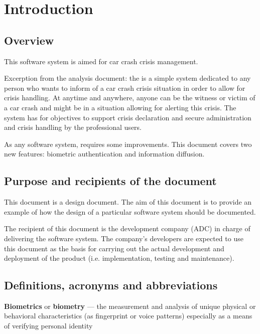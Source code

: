 \chapter{Introduction}
\label{chap:introduction}


\section{Overview}
This software system is aimed for car crash crisis management.

Excerption from the analysis document: the \msricrash is a simple system
dedicated to any person who wants to inform of a car crash crisis situation in
order to allow for crisis handling. At anytime and anywhere, anyone can be the
witness or victim of a car crash and might be in a situation allowing for
alerting this crisis. The \msricrash system has for objectives to support crisis
declaration and secure administration and crisis handling by the \msricrash
professional users.

As any software system, \msricrash requires some improvements. This document
covers two new features: biometric authentication and information diffusion.




\section{Purpose and recipients of the document}
This document is a design document. The aim of this document is to provide an
example of how the design of a particular software system should be documented. 

The recipient of this document is the development company (ADC) in charge
of delivering the software system. The company's developers are
expected to use this document as the basis for carrying out the actual
development and deployment of the product (i.e. implementation, testing
and maintenance).





\section{Definitions, acronyms and abbreviations}
\textbf{Biometrics} or \textbf{biometry} — the measurement and analysis of
unique physical or behavioral characteristics (as fingerprint or voice patterns)
especially as a means of verifying personal identity


